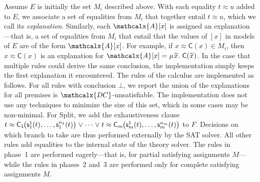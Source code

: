 \documentclass[smallcondensed,draft]{svjour3}
\newcommand\DISC[1]{t \teq \const{C}_{#1}\negvthinspace\bigl(\const s^1_{#1}( t ), \ldots,\const s^{n_{#1}}_{#1}( t )\bigr)}
\newcommand\MU{\vvthinspace\mu\vvthinspace}
\newcommand\const[1]{\textsf{#1}}
\newcommand{\Ec}{E}
\newcommand{\rn}[1]{\textsf{#1}}
\newcommand{\teq}{\approx}
\newcommand{\ec}[1]{[#1]}
\newcommand{\Val}{\mathcalx{A}\vvthinspace}
\newcommand{\Varec}[1]{\vvthinspace\widetilde{#1}\vvthinspace}
\newcommand{\thD}{\mathcalx{DC}}
\newcommand\vvthinspace{\kern+0.041667em}
\newcommand\negvthinspace{\kern-0.083333em}
\begin{document}
Assume $\Ec$ is initially the set $M_i$ described above. With each equality $t \teq u$ added
to $\Ec$, we associate a set of equalities from $M_i$ that together entail $t
\teq u$, which we call its \emph{explanation}.
Similarly, each $\Val \ec{x}$ is assigned an explanation---that is, a set
of equalities from $M_i$ that entail that the values of $\ec{x}$ in models of
$\Ec$ are of the form $\Val \ec{x}$. For example, if $x \teq \const{C}( x ) \in
M_i$, then $x \teq \const{C}( x )$ is an %
explanation for $\Val \ec{x} = \MU {\Varec{x}}.\; \const{C}( {\Varec{x}} )$.
In the case that multiple rules could derive the same conclusion,
the implementation simply keeps the first explanation it encountered.
The rules of the calculus are implemented as follows. For all rules with
conclusion $\bot$, we report the union of the explanations for all premises is
$\thD$-unsatisfiable. The implementation does not 
use any techniques to minimize the size of this set, which in some cases may be non-minimal.
For \rn{Split}, we add the exhaustiveness clause %
$\DISC{1} \mathrel\lor \cdots \mathrel\lor \DISC{m}$ to $F$.
Decisions on which branch to take are thus performed externally by the SAT
solver. %
All other rules add equalities to the
internal state of the theory solver. The rules in phase~1 are performed
eagerly---that is, for partial satisfying assignments $M$---while the rules in
phases~2 and~3 are performed only for complete satisfying
assignments $M$.
\end{document}
